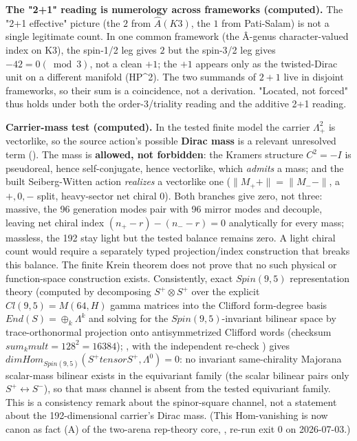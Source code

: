 \documentclass[11pt]{article}
\theoremstyle{remark}
\begin{document}
\textbf{The "2+1" reading is numerology across frameworks (computed).} The "2+1 effective" picture (the $2$ from $\widehat{A}(K3)$, the $1$ from Pati-Salam) is not a single legitimate count. In one common framework (the Â-genus character-valued index on K3), the spin-1/2 leg gives $2$ but the spin-3/2 leg gives $-42 = 0 (\bmod 3)$, not a clean $+1$; the $+1$ appears only as the twisted-Dirac unit on a different manifold (HP\textasciicircum{}2). The two summands of $2+1$ live in disjoint frameworks, so their sum is a coincidence, not a derivation. "Located, not forced" thus holds under both the order-3/triality reading and the additive 2+1 reading.

\textbf{Carrier-mass test (computed).} In the tested finite model the carrier $\Lambda^2_+$ is vectorlike, so the source action's possible \textbf{Dirac mass} is a relevant unresolved term (). The mass is \textbf{allowed, not forbidden}: the Kramers structure $C^2 = -I$ is pseudoreal, hence self-conjugate, hence vectorlike, which \emph{admits} a mass; and the built Seiberg-Witten action \emph{realizes} a vectorlike one ($\lVert M_++ \rVert = \lVert M_-- \rVert$, a ${+, 0, -}$ split, heavy-sector net chiral 0). Both branches give zero, not three: massive, the 96 generation modes pair with 96 mirror modes and decouple, leaving net chiral index $(n_+ - r) - (n_- - r) = 0$ analytically for every mass; massless, the 192 stay light but the tested balance remains zero. A light chiral count would require a separately typed projection/index construction that breaks this balance. The finite Krein theorem does not prove that no such physical or function-space construction exists. Consistently, exact $Spin(9,5)$ representation theory (computed by decomposing $S^+ \otimes S^+$ over the explicit $Cl(9,5) = M(64,H)$ gamma matrices into the Clifford form-degree basis $End(S) = \oplus_k \Lambda^k$ and solving for the $Spin(9,5)$-invariant bilinear space by trace-orthonormal projection onto antisymmetrized Clifford words (checksum $sum_k mult = 128^2 = 16384$); , with the independent re-check ) gives $dim Hom_{Spin(9,5)}(S^+ tensor S^+, \Lambda^0) = 0$: no invariant same-chirality Majorana scalar-mass bilinear exists in the equivariant family (the scalar bilinear pairs only $S^+ \leftrightarrow S^-$), so that mass channel is absent from the tested equivariant family. This is a consistency remark about the spinor-square channel, not a statement about the 192-dimensional carrier's Dirac mass. (This Hom-vanishing is now canon as fact (A) of the two-arena rep-theory core, , re-run exit 0 on 2026-07-03.)
\end{document}
